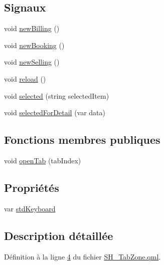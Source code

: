 \subsection*{Signaux}
\begin{DoxyCompactItemize}
\item 
void \hyperlink{classSH__TabZone_a6dce834477f22e68a3c35269d69d942f}{new\-Billing} ()
\item 
void \hyperlink{classSH__TabZone_aa83131a41d95f9cd16747d89c2c530aa}{new\-Booking} ()
\item 
void \hyperlink{classSH__TabZone_a12ef2e459df85b55e462a0461a5bc15b}{new\-Selling} ()
\item 
void \hyperlink{classSH__TabZone_a22fe45dad2c65c83b794df80fe34c131}{reload} ()
\item 
void \hyperlink{classSH__TabZone_ad500416727acbeb29222c15f99edb496}{selected} (string selected\-Item)
\item 
void \hyperlink{classSH__TabZone_abe3e575582494b892f3011363e8117c6}{selected\-For\-Detail} (var data)
\end{DoxyCompactItemize}
\subsection*{Fonctions membres publiques}
\begin{DoxyCompactItemize}
\item 
void \hyperlink{classSH__TabZone_a51e85d29cf8076ebd9a89304815068e3}{open\-Tab} (tab\-Index)
\end{DoxyCompactItemize}
\subsection*{Propriétés}
\begin{DoxyCompactItemize}
\item 
var \hyperlink{classSH__TabZone_a23223ca4d8158e2f50564d92364f6e14}{std\-Keyboard}
\end{DoxyCompactItemize}


\subsection{Description détaillée}


Définition à la ligne \hyperlink{SH__TabZone_8qml_source_l00004}{4} du fichier \hyperlink{SH__TabZone_8qml_source}{S\-H\-\_\-\-Tab\-Zone.\-qml}.



